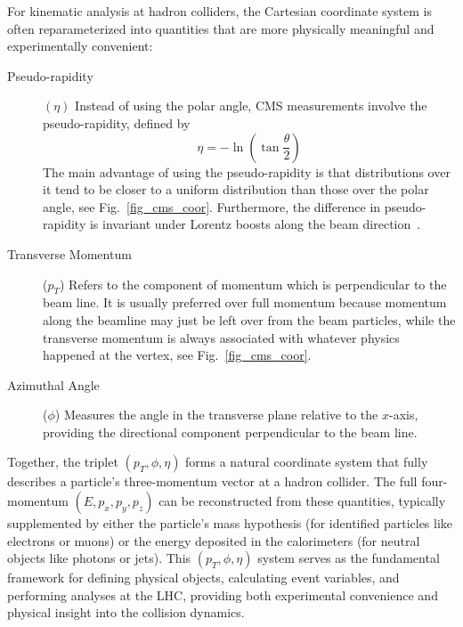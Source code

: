 \begin{center}
  
  \label{fig_cms_coor}
\end{center}

For kinematic analysis at hadron colliders, the Cartesian coordinate system is often reparameterized into quantities that are more physically meaningful and experimentally convenient:

\begin{description}
	\item[Pseudo-rapidity] $(\eta)$ Instead of using the polar angle, CMS measurements involve the pseudo-rapidity, defined by
	$$
	\eta=-\ln \left(\tan \frac{\theta}{2}\right)
	$$
	The main advantage of using the pseudo-rapidity is that distributions over it tend to be closer to a uniform distribution than those over the polar angle, see Fig.~\ref{fig_cms_coor}. Furthermore, the difference in pseudo-rapidity is invariant under Lorentz boosts along the beam direction~\parencite{book:1123430}.
	
	\item[Transverse Momentum] ($p_T$) Refers to the component of momentum which is perpendicular to the beam line. It is usually preferred over full momentum because momentum along the beamline may just be left over from the beam particles, while the transverse momentum is always associated with whatever physics happened at the vertex, see Fig.~\ref{fig_cms_coor}.
	
	\item[Azimuthal Angle] ($\phi$) Measures the angle in the transverse plane relative to the $x$-axis, providing the directional component perpendicular to the beam line.
\end{description}

Together, the triplet $(p_T, \phi, \eta)$ forms a natural coordinate system that fully describes a particle's three-momentum vector at a hadron collider. The full four-momentum $(E, p_x, p_y, p_z)$ can be reconstructed from these quantities, typically supplemented by either the particle's mass hypothesis (for identified particles like electrons or muons) or the energy deposited in the calorimeters (for neutral objects like photons or jets). This $(p_T, \phi, \eta)$ system serves as the fundamental framework for defining physical objects, calculating event variables, and performing analyses at the LHC, providing both experimental convenience and physical insight into the collision dynamics.


